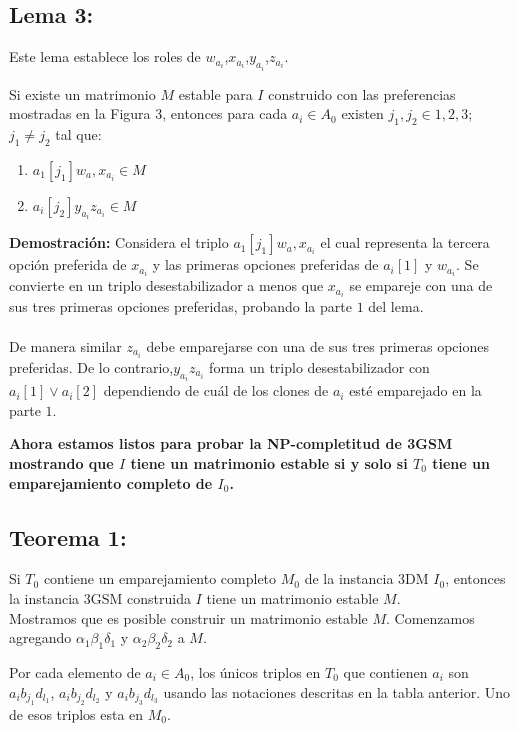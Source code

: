 \documentclass{article}
\begin{document}
\subsection{Lema 3:}
Este lema establece los roles de $w_{a_i}$,$x_{a_i}$,$y_{a_i}$,$z_{a_i}$.

Si existe un matrimonio $M$ estable para $I$ construido con las preferencias mostradas en la Figura 3, entonces para cada $a_i \in A_0$ existen $j_1,j_2 \in 1,2,3$; $j_1 \neq j_2$ tal que:
\begin{enumerate}
    \item $a_1[j_1]w_a,x_{a_i} \in M$
    \item $a_i[j_2]y_{a_i}z_{a_i}\in M$
\end{enumerate}

\textbf{Demostración: } Considera el triplo $a_1[j_1]w_a,x_{a_i}$ el cual representa la tercera opción preferida de $x_{a_i}$ y las primeras opciones preferidas de $a_i[1]$ y $w_{a_i}$. Se convierte en un triplo desestabilizador a menos que $x_{a_i}$
se empareje con una de sus tres primeras opciones preferidas, probando la parte $1$ del lema.\\
\\
De manera similar $z_{a_i}$ debe emparejarse con una de sus tres primeras opciones preferidas. De lo contrario,$y_{a_i}z_{a_i}$ forma un triplo desestabilizador con $a_i[1] \lor a_i[2]$ dependiendo de cuál de los clones de $a_i$ esté emparejado en la parte $1$.

\textbf{Ahora estamos listos para probar la NP-completitud de 3GSM mostrando que $I$ tiene un matrimonio estable si y solo si $T_0$ tiene un emparejamiento completo de $I_0$.}

\subsection{Teorema 1:}
Si $T_0$ contiene un emparejamiento completo $M_0$ de la instancia 3DM $I_0$, entonces la instancia 3GSM construida $I$ tiene un matrimonio estable $M$.
\\

Mostramos que es posible construir un matrimonio estable $ M $. Comenzamos agregando $\alpha_1 \beta_1 \delta_1$ y $\alpha_2 \beta_2 \delta_2$ a $M$.

Por cada elemento de $a_i \in A_0$, los únicos triplos en $T_0 $ que contienen $a_i$ son $a_i b_{j_1} d_{l_1} $, $a_i b_{j_2} d_{l_2} $
y $a_i b_{j_3} d_{l_3} $ usando las notaciones descritas en la tabla anterior. Uno de esos triplos esta en $M_0$.
\end{document}
